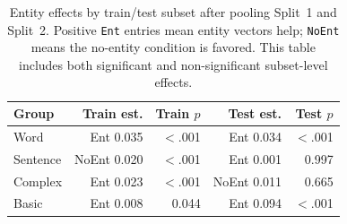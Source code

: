 \begin{table}[t]
\centering\scriptsize
\begin{tabular}{@{}lrrrr@{}}
\toprule
\textbf{Group} & \textbf{Train est.} & \textbf{Train $p$} & \textbf{Test est.} & \textbf{Test $p$} \\
\midrule
Word & Ent 0.035 & $<$.001 & Ent 0.034 & $<$.001 \\
Sentence & NoEnt 0.020 & $<$.001 & Ent 0.001 & 0.997 \\
Complex & Ent 0.023 & $<$.001 & NoEnt 0.011 & 0.665 \\
Basic & Ent 0.008 & 0.044 & Ent 0.094 & $<$.001 \\
\bottomrule
\end{tabular}
\caption{\small Entity effects by train/test subset after pooling Split~1 and Split~2. Positive \texttt{Ent} entries mean entity vectors help; \texttt{NoEnt} means the no-entity condition is favored. This table includes both significant and non-significant subset-level effects.}
\label{tab:gap_entity_by_subset}
\end{table}
